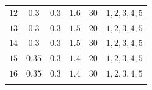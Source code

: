 \documentclass[a4paper]{cas-sc}
\begin{document}
\begin{table}
{\begin{tabular}{lccccl}
      $12$             & $0.3$                     & $0.3 $                    & $1.6$                 & $30$          & $1,2,3,4,5$                   \\
      $13$             & $0.3$                     & $0.3 $                    & $1.5$                 & $20$          & $1,2,3,4,5$                   \\
      $14$             & $0.3$                     & $0.3 $                    & $1.5$                 & $30$          & $1,2,3,4,5$                   \\
      $15$             & $0.35$                    & $0.3 $                    & $1.4$                 & $20$          & $1,2,3,4,5$                   \\
      $16$             & $0.35$                    & $0.3 $                    & $1.4$                 & $30$          & $1,2,3,4,5$                   \\
      \bottomrule
      \label{tableB1}
    \end{tabular}}
\end{table}
\end{document}
